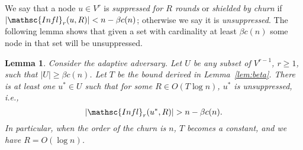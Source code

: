 \documentclass[leqno,11pt]{article}
\newtheorem{lemma}[theorem]{Lemma}
\renewcommand{\ge}{\geqslant}
\newcommand{\infl}{{\mathsc{Infl}}}
\begin{document}
We say that a node $u \in V^r$ is \emph{suppressed for $R$ rounds} or \emph{shielded by churn} if $|\infl_r(u, R)|
< n - \beta c(n)$; otherwise we say it is \emph{unsuppressed}. The following lemma shows
that given a set with cardinality at least $\beta c(n)$ some node in that set will be
unsuppressed. 



\begin{lemma}\label{lem:supp}
Consider the adaptive adversary.
Let $U$ be any subset of $V^{r-1}$, $r \ge 1$, such that $|U| \ge \beta c(n)$.
Let $T$ be the bound derived in
Lemma~\ref{lem:beta}. There is at least one $u^* \in U$ such that for some $R
\in O(T\log n)$, $u^*$ is unsuppressed, i.e.,  
\[|\infl_r(u^*,R)| > n- \beta c(n).\]
In particular, when the
order of the churn is $n$, $T$ becomes a constant, and we have $R = O(\log n)$. 
\end{lemma}
\end{document}
